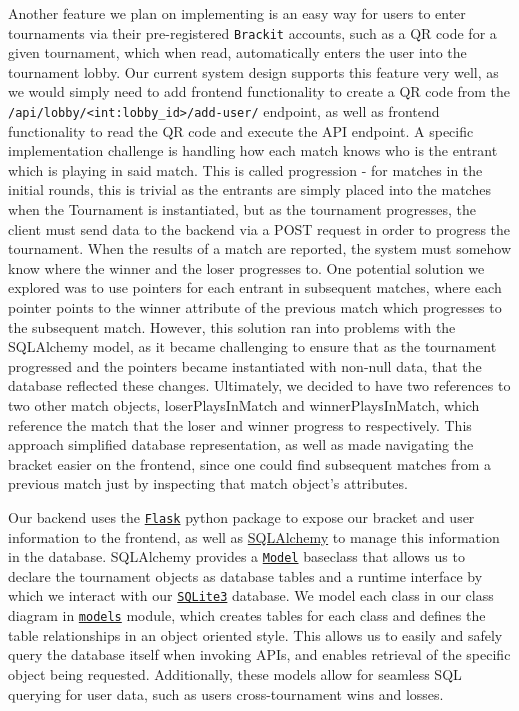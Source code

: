 \documentclass{article}
\begin{document}
Another feature we plan on implementing is an easy way for users to enter tournaments via their pre-registered \texttt{Brackit} accounts,
such as a QR code for a given tournament, which when read, automatically enters the user into the tournament lobby. Our current 
system design supports this feature very well, as we would simply need to add frontend functionality to create a QR code from the 
\texttt{/api/lobby/<int:lobby\_id>/add-user/} endpoint, as well as frontend functionality to read the QR code and execute the API endpoint.
A specific implementation challenge is handling how each match knows who is the entrant which is playing 
in said match. This is called progression - for matches in the initial rounds, this is trivial as 
the entrants are simply placed into the matches when the Tournament is instantiated, but as the tournament
progresses, the client must send data to the backend via a POST request in order to progress the tournament.
When the results of a match are reported, the system must somehow know where the winner and the loser progresses to.
One potential solution we explored was to use pointers for each entrant in subsequent matches, where each pointer 
points to the winner attribute of the previous match which progresses to the subsequent match. However, this 
solution ran into problems with the SQLAlchemy model, as it became challenging to ensure that as the tournament 
progressed and the pointers became instantiated with non-null data, that the database reflected these changes. 
Ultimately, we decided to have two references to two other match objects, loserPlaysInMatch and winnerPlaysInMatch, 
which reference the match that the loser and winner progress to respectively. This approach simplified database 
representation, as well as made navigating the bracket easier on the frontend, since one could find subsequent matches
from a previous match just by inspecting that match object's attributes.

Our backend uses the \href{https://flask.palletsprojects.com/en/1.1.x/}{\texttt{Flask}} python package to expose our bracket and user information to 
the frontend, as well as \href{https://www.sqlalchemy.org/}{SQLAlchemy} to manage this information in the database. SQLAlchemy provides a \href{https://flask-sqlalchemy.palletsprojects.com/en/2.x/models/}{\texttt{Model}} baseclass that allows us to declare the tournament objects as database tables and a runtime interface by which we interact with our \href{https://www.sqlite.org/index.html}{\texttt{SQLite3}} database. We model each class in our class diagram in \href{https://github.com/alextrosta/brackit/blob/master/backend/app/models.py}{\texttt{models}} module, which creates 
tables for each class and defines the table relationships in an object oriented style. This 
allows us to easily and safely query the database itself when invoking APIs, and enables 
retrieval of the specific object being requested. Additionally, these models allow for 
seamless SQL querying for user data, such as users cross-tournament wins and losses. 
\end{document}
